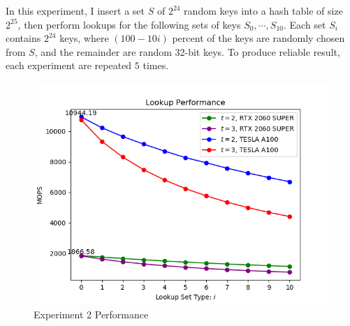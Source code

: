 \documentclass[10pt,twocolumn,letterpaper]{article}
\begin{document}
In this experiment, I insert a set $S$ of $2^{24}$ random keys into a hash table of size $2^{25}$, then perform lookups for the following sets of keys $S_0, \cdots, S_{10}$. Each set $S_i$ contains $2^{24}$ keys, where $(100 - 10i)$ percent of the keys are randomly chosen from $S$, and the remainder are random 32-bit keys. To produce reliable result, each experiment are repeated $5$ times.
 
\begin{figure}[h]
    \centering
    \includegraphics[scale=0.5]{figures/2.png}
    \caption{Experiment 2 Performance}
    \label{fig:experiment2}
\end{figure}
\end{document}
